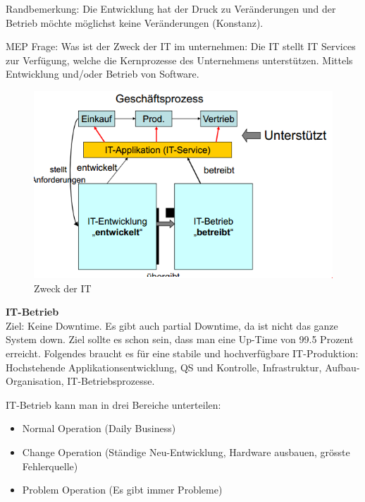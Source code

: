 Randbemerkung: Die Entwicklung hat der Druck zu Veränderungen und der Betrieb möchte möglichst keine Veränderungen (Konstanz).

MEP Frage: Was ist der Zweck der IT im unternehmen:
\label{zweck-der-it-im-unternehmen}
Die IT stellt IT Services zur Verfügung, welche die Kernprozesse des Unternehmens unterstützen. Mittels Entwicklung und/oder Betrieb von Software.

\begin{figure}[h!]
	\centering
	\includegraphics{fig/zweck-der-it}
	\caption{Zweck der IT}
\end{figure}

\textbf{IT-Betrieb}\\
Ziel: Keine Downtime. Es gibt auch partial Downtime, da ist nicht das ganze System down. Ziel sollte es schon sein, dass man eine Up-Time von 99.5 Prozent erreicht. Folgendes braucht es für eine stabile und hochverfügbare IT-Produktion: Hochstehende Applikationsentwicklung, QS und Kontrolle, Infrastruktur, Aufbau-Organisation, IT-Betriebsprozesse.

IT-Betrieb kann man in drei Bereiche unterteilen: 

\begin{itemize}
	\item Normal Operation (Daily Business)
	\item Change Operation (Ständige Neu-Entwicklung, Hardware ausbauen, grösste Fehlerquelle)
	\item Problem Operation (Es gibt immer Probleme)
\end{itemize}

